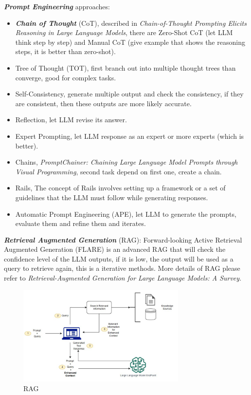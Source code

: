 \documentclass[10pt]{elegantbook}
\newcommand{\mydefination}[1]{\textbf{\textit{\textcolor{structurecolor}{#1}}}}
\begin{document}
\vspace{\baselineskip}

\mydefination{Prompt Engineering} approaches:
\begin{itemize}
    \item \mydefination{Chain of Thought} (CoT), described in \textit{Chain-of-Thought Prompting Elicits Reasoning in Large Language Models}, there are Zero-Shot
CoT (let LLM think step by step) and Manual CoT (give example that shows the reasoning steps, it is better than zero-shot).
    \item Tree of Thought (TOT), first branch out into multiple thought trees than converge, good for complex tasks.
    \item Self-Consistency, generate multiple output and check the consistency, if they are consistent, then these outputs are more likely accurate.
    \item Reflection, let LLM revise its answer.
    \item Expert Prompting, let LLM response as an expert or more experts (which is better).
    \item Chains, \textit{PromptChainer: Chaining Large Language Model Prompts through Visual Programming}, second task depend on first one, create a chain.
    \item Rails, The concept of Rails involves setting up a framework or a set of guidelines that the LLM must follow while generating responses.
    \item Automatic Prompt Engineering (APE), let LLM to generate the prompts, evaluate them and refine them and iterates.
\end{itemize}

\vspace{\baselineskip}

\mydefination{Retrieval Augmented Generation} (RAG): Forward-looking Active Retrieval Augmented Generation
(FLARE) is an advanced RAG that will check the confidence level of the LLM outputs, if it is low, the output will be used as a query to retrieve again, this is
a iterative methods. More details of RAG please refer to \textit{Retrieval-Augmented Generation for Large Language Models: A Survey}.
\begin{figure}[htbp]
    \centering
    \includegraphics[width=0.75\textwidth]{image/rag.jpg}
    \caption{RAG}
    \label{fig:rag}
\end{figure}
\end{document}
